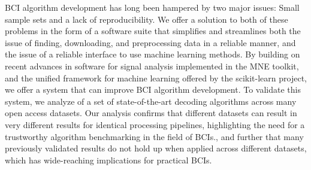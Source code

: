 BCI algorithm development has long been hampered by two major issues: Small
sample sets and a lack of reproducibility. We offer a solution to both of these
problems in the form of a software suite that simplifies and streamlines both
the issue of finding, downloading, and preprocessing data in a reliable manner,
and the issue of a reliable interface to use machine learning methods. By
building on recent advances in software for signal analysis implemented in the MNE toolkit,
and the unified framework for machine learning offered by the scikit-learn
project, we offer a system that can improve BCI algorithm development. To
validate this system, we analyze of a set of state-of-the-art decoding
algorithms across many open access datasets. Our analysis confirms that
different datasets can result in very different results for identical processing
pipelines, highlighting the need for a trustworthy algorithm benchmarking in the
field of BCIs., and further that many previously validated results do not hold
up when applied across different datasets, which has wide-reaching implications
for practical BCIs.

